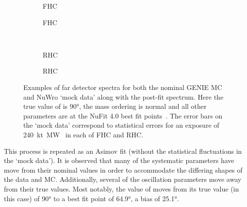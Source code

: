 \begin{figure}[h]
	\begin{subfigure}[t]{0.5\linewidth}
		\begin{adjustbox}{max totalsize=\linewidth, center}
			
		\end{adjustbox}	
		\caption{\numu FHC}	
	\end{subfigure}	
	\hfill
	\begin{subfigure}[t]{0.5\linewidth}
		\begin{adjustbox}{max totalsize=\linewidth, center}
			
		\end{adjustbox}	
		\caption{\nue FHC}	
	\end{subfigure} \\ 
	\begin{subfigure}[t]{0.5\linewidth}
		\begin{adjustbox}{max totalsize=\linewidth, center}
			
		\end{adjustbox}	
		\caption{\numu RHC}	
	\end{subfigure}	
	\hfill
	\begin{subfigure}[t]{0.5\linewidth}
		\begin{adjustbox}{max totalsize=\linewidth, center}
			
		\end{adjustbox}		
		\caption{\nue RHC}
	\end{subfigure}
	\caption[Examples of far detector spectra for both the nominal GENIE MC and NuWro `mock data' along with the post-fit spectrum]{Examples of far detector spectra for both the nominal GENIE MC and NuWro `mock data' along with the post-fit spectrum. Here the true value of \dcp is \ang{90}, the mass ordering is normal and all other parameters are at the NuFit 4.0 best fit points~\cite{nufit4}. The error bars on the `mock data' correspond to statistical errors for an exposure of \SI{240}{\kilo\tonne\mega\watt\year} in each of FHC and RHC.}
	\label{fig:fdSamplesPostFit}
\end{figure}

This process is repeated as an Asimov fit (without the statistical fluctuations in the `mock data').
It is observed that many of the systematic parameters have move from their nominal values in order to accommodate the differing shapes of the data and MC.
Additionally, several of the oscillation parameters move away from their true values.
Most notably, the value of \dcp moves from its true value (in this case) of \ang{90} to a best fit point of \ang{64.9}, a bias of \ang{25.1}.

